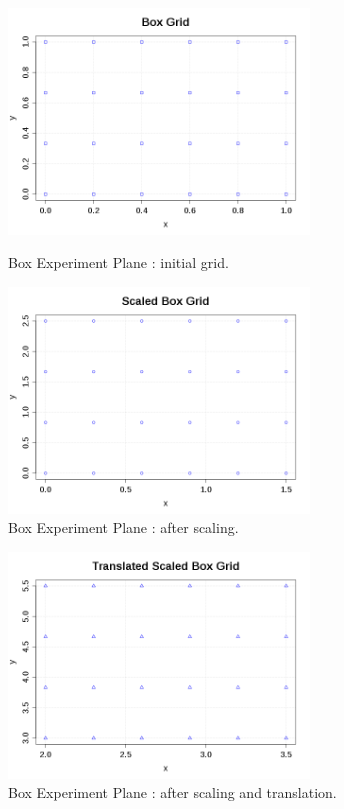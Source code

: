 \begin{figure}[H]
  \begin{minipage}{10cm}
    \begin{center}
      \includegraphics[width=8cm]{BoxGrid.png}
      \caption{Box Experiment Plane : initial grid.}
      \label{BoxGrid}
    \end{center}
  \end{minipage}
  \hfill
  \begin{minipage}{10cm}
    \begin{center}
      \includegraphics[width=8cm]{ScaledBoxGrid.png}
      \caption{Box Experiment Plane : after scaling.}
      \label{ScaledBoxGrid}
    \end{center}
  \end{minipage}
\end{figure}

\begin{figure}[H]
  \begin{center}
    \includegraphics[width=8cm]{TranslatedScaledBoxGrid.png}
  \end{center}
  \caption{Box Experiment Plane : after scaling and translation.}
  \label{TranslatedScaledBoxGrid}
\end{figure}




